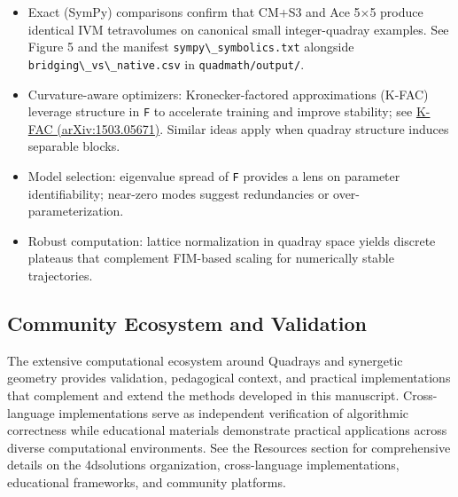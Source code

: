 \documentclass[
  10pt,
]{article}
\newcommand{\passthrough}[1]{#1}
\begin{document}
\begin{itemize}
\item
  Exact (SymPy) comparisons confirm that CM+S3 and Ace 5×5 produce
  identical IVM tetravolumes on canonical small integer-quadray
  examples. See Figure 5 and the manifest
  \passthrough{\lstinline!sympy\_symbolics.txt!} alongside
  \passthrough{\lstinline!bridging\_vs\_native.csv!} in
  \passthrough{\lstinline!quadmath/output/!}.
\item
  Curvature-aware optimizers: Kronecker-factored approximations (K-FAC)
  leverage structure in \passthrough{\lstinline!F!} to accelerate
  training and improve stability; see
  \href{https://arxiv.org/abs/1503.05671}{K-FAC (arXiv:1503.05671)}.
  Similar ideas apply when quadray structure induces separable blocks.
\item
  Model selection: eigenvalue spread of \passthrough{\lstinline!F!}
  provides a lens on parameter identifiability; near-zero modes suggest
  redundancies or over-parameterization.
\item
  Robust computation: lattice normalization in quadray space yields
  discrete plateaus that complement FIM-based scaling for numerically
  stable trajectories.
\end{itemize}

\hypertarget{community-ecosystem-and-validation}{%
\subsection{Community Ecosystem and
Validation}\label{community-ecosystem-and-validation}}

The extensive computational ecosystem around Quadrays and synergetic
geometry provides validation, pedagogical context, and practical
implementations that complement and extend the methods developed in this
manuscript. Cross-language implementations serve as independent
verification of algorithmic correctness while educational materials
demonstrate practical applications across diverse computational
environments. See the Resources section for comprehensive details on the
4dsolutions organization, cross-language implementations, educational
frameworks, and community platforms.
\end{document}
